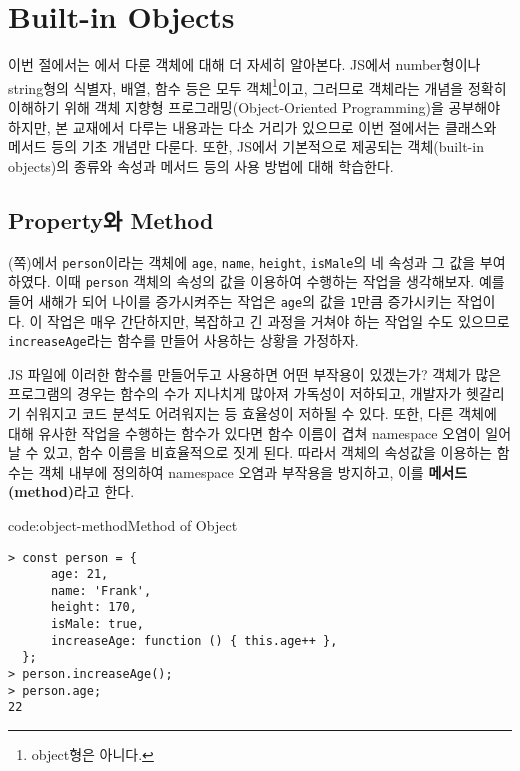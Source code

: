 \section{Built-in Objects} \label{sect:built-in-objects}

이번 절에서는 에서 다룬 객체에 대해 더 자세히 알아본다. JS에서 number형이나 string형의 식별자, 배열, 함수 등은 모두 객체\footnote{object형은 아니다.}이고, 그러므로 객체라는 개념을 정확히 이해하기 위해 객체 지향형 프로그래밍(Object-Oriented Programming)을 공부해야 하지만, 본 교재에서 다루는 내용과는 다소 거리가 있으므로 이번 절에서는 클래스와 메서드 등의 기초 개념만 다룬다. 또한, JS에서 기본적으로 제공되는 객체(built-in objects)의 종류와 속성과 메서드 등의 사용 방법에 대해 학습한다.

\subsection*{Property와 Method}

(\pageref{code:object-type}쪽)에서 \texttt{person}이라는 객체에 \texttt{age}, \texttt{name}, \texttt{height}, \texttt{isMale}의 네 속성과 그 값을 부여하였다. 이때 \texttt{person} 객체의 속성의 값을 이용하여 수행하는 작업을 생각해보자. 예를 들어 새해가 되어 나이를 증가시켜주는 작업은 \texttt{age}의 값을 \texttt{1}만큼 증가시키는 작업이다. 이 작업은 매우 간단하지만, 복잡하고 긴 과정을 거쳐야 하는 작업일 수도 있으므로 \texttt{increaseAge}라는 함수를 만들어 사용하는 상황을 가정하자.

JS 파일에 이러한 함수를 만들어두고 사용하면 어떤 부작용이 있겠는가? 객체가 많은 프로그램의 경우는 함수의 수가 지나치게 많아져 가독성이 저하되고, 개발자가 헷갈리기 쉬워지고 코드 분석도 어려워지는 등 효율성이 저하될 수 있다. 또한, 다른 객체에 대해 유사한 작업을 수행하는 함수가 있다면 함수 이름이 겹쳐 namespace 오염이 일어날 수 있고, 함수 이름을 비효율적으로 짓게 된다. 따라서 객체의 속성값을 이용하는 함수는 객체 내부에 정의하여 namespace 오염과 부작용을 방지하고, 이를 \textbf{메서드(method)}라고 한다.

\begin{codeenv}{code:object-method}{Method of Object}\begin{verbatim}
> const person = {
      age: 21,
      name: 'Frank',
      height: 170,
      isMale: true,
      increaseAge: function () { this.age++ },
  };
> person.increaseAge();
> person.age;
22
\end{verbatim}
\end{codeenv}

